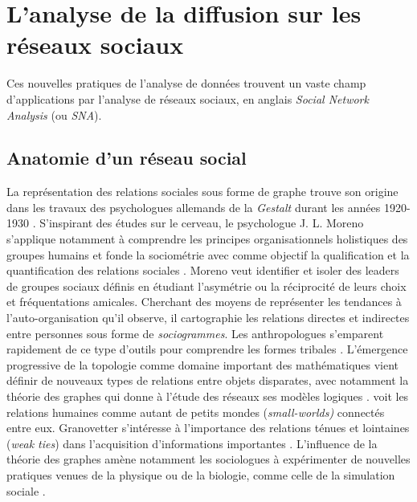 \section[L{\textquoteright}analyse de la diffusion sur les réseaux sociaux]{L{\textquoteright}analyse de la diffusion sur les réseaux sociaux}

Ces nouvelles pratiques de l'analyse de données trouvent un vaste champ d'applications par l{\textquoteright}analyse de réseaux sociaux, en anglais \textit{Social Network Analysis} (ou \textit{SNA}). 


\subsection[Anatomie d{\textquoteright}un réseau social]{ Anatomie d{\textquoteright}un réseau social}

La représentation des relations sociales sous forme de graphe trouve son origine dans les travaux des psychologues allemands de la \textit{Gestalt} durant les années 1920-1930 \citep{Scott1988}. S{\textquoteright}inspirant des études sur le cerveau, le psychologue J. L. Moreno s{\textquoteright}applique notamment à comprendre les principes organisationnels holistiques des groupes humains et fonde la sociométrie avec comme objectif la qualification et la quantification des relations sociales \citep{Moreno1938}. Moreno veut identifier et isoler des leaders de groupes sociaux définis en étudiant l{\textquoteright}asymétrie ou la réciprocité de leurs choix et fréquentations amicales. Cherchant des moyens de représenter les tendances à l{\textquoteright}auto-organisation qu{\textquoteright}il observe, il cartographie les relations directes et indirectes entre personnes sous forme de \textit{sociogrammes}. Les anthropologues s{\textquoteright}emparent rapidement de ce type d{\textquoteright}outils pour comprendre les formes tribales \citep{Lundberg1975}. L{\textquoteright}émergence progressive de la topologie comme domaine important des mathématiques vient définir de nouveaux types de relations entre objets disparates, avec notamment la théorie des graphes qui donne à l{\textquoteright}étude des réseaux ses modèles logiques \citep{Harary1977}. \cite{Travers1969} voit les relations humaines comme autant de petits mondes (\textit{small-worlds)} connectés entre eux. Granovetter s{\textquoteright}intéresse à l{\textquoteright}importance des relations ténues et lointaines (\textit{weak ties}) dans l{\textquoteright}acquisition d{\textquoteright}informations importantes \citep{Granovetter1973}. L{\textquoteright}influence de la théorie des graphes amène notamment les sociologues à expérimenter de nouvelles pratiques venues de la physique ou de la biologie, comme celle de la simulation sociale \citep{Epstein1996}. 


